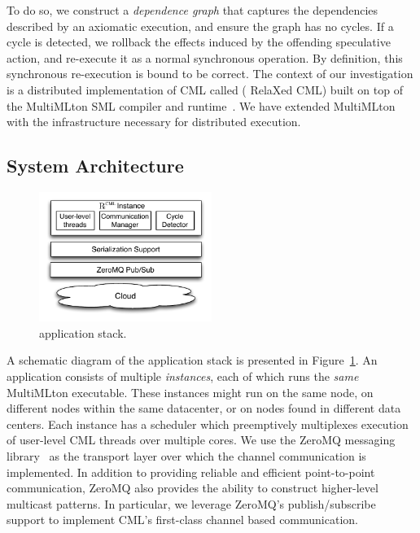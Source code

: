 To do so, we construct a \emph{dependence graph} that captures the dependencies
described by an axiomatic execution, and ensure the graph has no cycles. If a
cycle is detected, we rollback the effects induced by the offending speculative
action, and re-execute it as a normal synchronous operation. By definition,
this synchronous re-execution is bound to be correct. The context of our
investigation is a distributed implementation of CML called \rxcml ({\sc
RelaXed CML}) built on top of the MultiMLton SML compiler and
runtime~\cite{JFP14}. We have extended MultiMLton with the infrastructure
necessary for distributed execution.

\subsection {System Architecture}

\begin{figure}
\centering
\includegraphics[width=0.5\textwidth]{Figures/CRexDesign}
\caption{\rxcml application stack.}
\label{fig:c-rex}
\end{figure}

A schematic diagram of the \rxcml application stack is presented in
Figure~\ref{fig:c-rex}. An \rxcml application consists of multiple
\emph{instances}, each of which runs the \emph{same} MultiMLton executable.
These instances might run on the same node, on different nodes within the same
datacenter, or on nodes found in different data centers. Each instance has a
scheduler which preemptively multiplexes execution of user-level CML threads
over multiple cores. We use the ZeroMQ messaging library~\cite{zeromq} as the
transport layer over which the \rxcml channel communication is implemented. In
addition to providing reliable and efficient point-to-point communication,
ZeroMQ also provides the ability to construct higher-level multicast patterns.
In particular, we leverage ZeroMQ's publish/subscribe support to implement
CML's first-class channel based communication.

